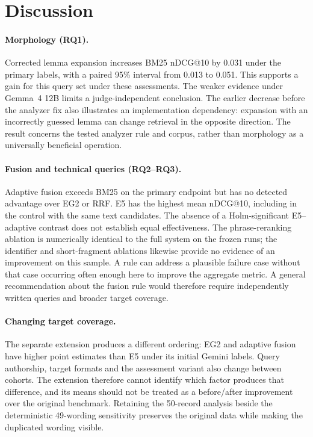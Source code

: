 \section{Discussion}\label{sec:discussion}

\paragraph{Morphology (RQ1).}
Corrected lemma expansion increases BM25 nDCG@10 by 0.031 under the primary labels, with a paired 95\% interval from 0.013 to 0.051. This supports a gain for this query set under these assessments. The weaker evidence under Gemma~4 12B limits a judge-independent conclusion. The earlier decrease before the analyzer fix also illustrates an implementation dependency: expansion with an incorrectly guessed lemma can change retrieval in the opposite direction. The result concerns the tested analyzer rule and corpus, rather than morphology as a universally beneficial operation.

\paragraph{Fusion and technical queries (RQ2--RQ3).}
Adaptive fusion exceeds BM25 on the primary endpoint but has no detected advantage over EG2 or RRF. E5 has the highest mean nDCG@10, including in the control with the same text candidates. The absence of a Holm-significant E5--adaptive contrast does not establish equal effectiveness. The phrase-reranking ablation is numerically identical to the full system on the frozen runs; the identifier and short-fragment ablations likewise provide no evidence of an improvement on this sample. A rule can address a plausible failure case without that case occurring often enough here to improve the aggregate metric. A general recommendation about the fusion rule would therefore require independently written queries and broader target coverage.

\paragraph{Changing target coverage.}
The separate extension produces a different ordering: EG2 and adaptive fusion have higher point estimates than E5 under its initial Gemini labels. Query authorship, target formats and the assessment variant also change between cohorts. The extension therefore cannot identify which factor produces that difference, and its means should not be treated as a before/after improvement over the original benchmark. Retaining the 50-record analysis beside the deterministic 49-wording sensitivity preserves the original data while making the duplicated wording visible.

